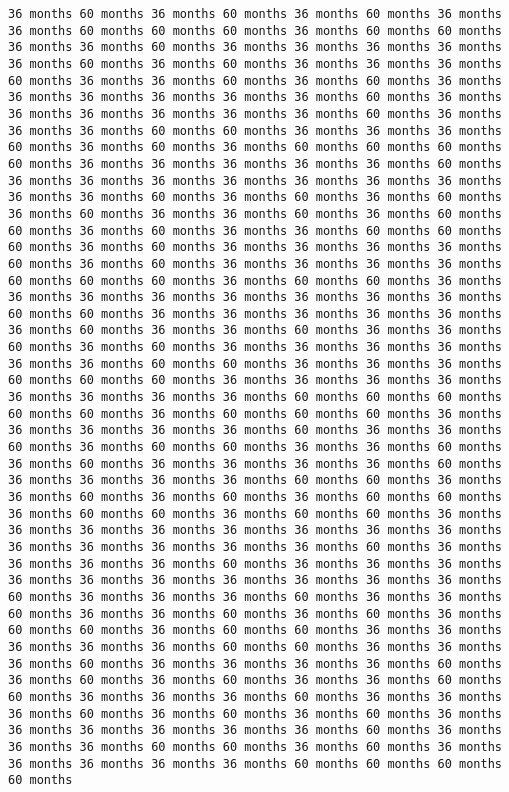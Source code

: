\documentclass[11pt]{article}
\begin{document}
\begin{Verbatim}[commandchars=\\\{\}, frame=single, framerule=2mm, rulecolor=\color{outerrorbackground}]
36 months 60 months 36 months 60 months 36 months 60 months 36 months 36 months 60 months 60 months 60 months 36 months 60 months 60 months 36 months 36 months 60 months 36 months 36 months 36 months 36 months 36 months 60 months 36 months 60 months 36 months 36 months 36 months 60 months 36 months 36 months 60 months 36 months 60 months 36 months 36 months 36 months 36 months 36 months 36 months 60 months 36 months 36 months 36 months 36 months 36 months 36 months 60 months 36 months 36 months 36 months 60 months 60 months 36 months 36 months 36 months 60 months 36 months 60 months 36 months 60 months 60 months 60 months 60 months 36 months 36 months 36 months 36 months 36 months 60 months 36 months 36 months 36 months 36 months 36 months 36 months 36 months 36 months 36 months 60 months 36 months 60 months 36 months 60 months 36 months 60 months 36 months 36 months 60 months 36 months 60 months 60 months 36 months 60 months 36 months 36 months 60 months 60 months 60 months 36 months 60 months 36 months 36 months 36 months 36 months 60 months 36 months 60 months 36 months 36 months 36 months 36 months 60 months 60 months 60 months 36 months 60 months 60 months 36 months 36 months 36 months 36 months 36 months 36 months 36 months 36 months 60 months 60 months 36 months 36 months 36 months 36 months 36 months 36 months 60 months 36 months 36 months 60 months 36 months 36 months 60 months 36 months 60 months 36 months 36 months 36 months 36 months 36 months 36 months 60 months 60 months 36 months 36 months 36 months 60 months 60 months 60 months 36 months 36 months 36 months 36 months 36 months 36 months 36 months 36 months 60 months 60 months 60 months 60 months 60 months 36 months 60 months 60 months 60 months 36 months 36 months 36 months 36 months 36 months 60 months 36 months 36 months 60 months 36 months 60 months 60 months 36 months 36 months 60 months 36 months 60 months 36 months 36 months 36 months 36 months 60 months 36 months 36 months 36 months 36 months 60 months 60 months 36 months 36 months 60 months 36 months 60 months 36 months 60 months 60 months 36 months 60 months 60 months 36 months 60 months 60 months 36 months 36 months 36 months 36 months 36 months 36 months 36 months 36 months 36 months 36 months 36 months 36 months 36 months 60 months 36 months 36 months 36 months 36 months 60 months 36 months 36 months 36 months 36 months 36 months 36 months 36 months 36 months 36 months 36 months 60 months 36 months 36 months 36 months 60 months 36 months 36 months 60 months 36 months 36 months 60 months 36 months 60 months 36 months 60 months 60 months 36 months 60 months 60 months 36 months 36 months 36 months 36 months 36 months 60 months 60 months 36 months 36 months 36 months 60 months 36 months 36 months 36 months 36 months 60 months 36 months 60 months 36 months 60 months 36 months 36 months 60 months 60 months 36 months 36 months 36 months 60 months 36 months 36 months 36 months 60 months 36 months 60 months 36 months 60 months 36 months 36 months 36 months 36 months 36 months 36 months 60 months 36 months 36 months 36 months 60 months 60 months 36 months 60 months 36 months 36 months 36 months 36 months 36 months 60 months 60 months 60 months 60 months 
\end{Verbatim}
\end{document}
